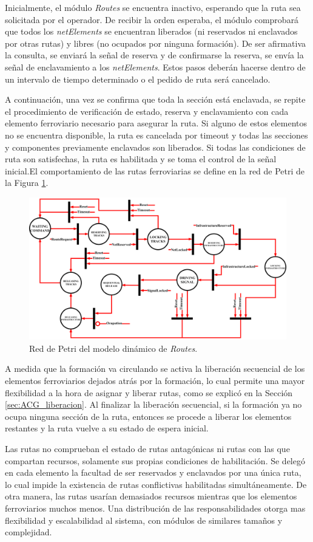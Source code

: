 	Inicialmente, el módulo \textit{Routes} se encuentra inactivo, esperando que la ruta sea solicitada por el operador. De recibir la orden esperaba, el módulo comprobará que todos los \textit{netElements} se encuentran liberados (ni reservados ni enclavados por otras rutas) y libres (no ocupados por ninguna formación). De ser afirmativa la consulta, se enviará la señal de reserva y de confirmarse la reserva, se envía la señal de enclavamiento a los \textit{netElements}. Estos pasos deberán hacerse dentro de un intervalo de tiempo determinado o el pedido de ruta será cancelado.
	
	A continuación, una vez se confirma que toda la sección está enclavada, se repite el procedimiento de verificación de estado, reserva y enclavamiento con cada elemento ferroviario necesario para asegurar la ruta. Si alguno de estos elementos no se encuentra disponible, la ruta es cancelada por timeout y todas las secciones y componentes previamente enclavados son liberados. Si todas las condiciones de ruta son satisfechas, la ruta es habilitada y se toma el control de la señal inicial.El comportamiento de las rutas ferroviarias se define en la red de Petri de la Figura \ref{fig:RTS_Petri}.
	
	\begin{figure}[H]
		\centering
		\includegraphics[width=1\textwidth]{Figuras/RTS_petri}
		\centering\caption{Red de Petri del modelo dinámico de \textit{Routes}.}
		\label{fig:RTS_Petri}
	\end{figure}
	
	A medida que la formación va circulando se activa la liberación secuencial de los elementos ferroviarios dejados atrás por la formación, lo cual permite una mayor flexibilidad a la hora de asignar y liberar rutas, como se explicó en la Sección \ref{sec:ACG_liberacion}. Al finalizar la liberación secuencial, si la formación ya no ocupa ninguna sección de la ruta, entonces se procede a liberar los elementos restantes y la ruta vuelve a su estado de espera inicial.
	
	Las rutas no comprueban el estado de rutas antagónicas ni rutas con las que compartan recursos, solamente sus propias condiciones de habilitación. Se delegó en cada elemento la facultad de ser reservados y enclavados por una única ruta, lo cual impide la existencia de rutas conflictivas habilitadas simultáneamente. De otra manera, las rutas usarían demasiados recursos mientras que los elementos ferroviarios muchos menos. Una distribución de las responsabilidades otorga mas flexibilidad y escalabilidad al sistema, con módulos de similares tamaños y complejidad.